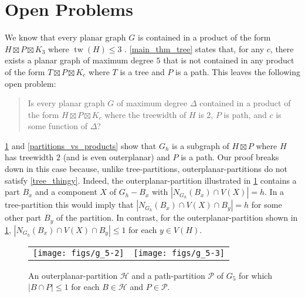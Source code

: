 \documentclass{patmorin}
\DeclareMathOperator{\tw}{tw}
\renewcommand{\le}{\leqslant}
\begin{document}
\section{Open Problems}

We know that every planar graph $G$ is contained in a product of the form $H\boxtimes P\boxtimes K_3$ where $\tw(H)\le 3$ \cite{dujmovic.joret.ea:planar}. \cref{main_thm_tree} states that, for any $c$, there exists a planar graph of maximum degree $5$ that is not contained in any product of the form $T\boxtimes P\boxtimes K_c$ where $T$ is a tree and $P$ is a path.  This leaves the following open problem:

\begin{quote}

  Is every planar graph $G$ of maximum degree $\Delta$ contained in a product of the form $H\boxtimes P\boxtimes K_c$ where the treewidth of $H$ is $2$, $P$ is path, and $c$ is some function of $\Delta$?
\end{quote}

\cref{two_tree} and \cref{partitions_vs_products} show that $G_h$ is a subgraph of $H\boxtimes P$ where $H$ has treewidth $2$ (and is even outerplanar) and $P$ is a path. Our proof breaks down in this case because, unlike tree-partitions, outerplanar-partitions do not satisfy \cref{tree_thingy}.  Indeed, the outerplanar-partition illustrated in \cref{two_tree} contains a part $B_x$ and a component $X$ of $G_h-B_x$ with $|N_{G_h}(B_x)\cap V(X)|=h$.  In a tree-partition this would imply that $|N_{G_h}(B_x)\cap V(X)\cap B_y|=h$ for some other part $B_y$ of the partition.  In contrast, for the outerplanar-partition shown in \cref{two_tree}, $|N_{G_h}(B_x)\cap V(X)\cap B_y|\le 1$ for each $y\in V(H)$.


\begin{figure}
  \begin{center}
    \begin{tabular}{cc}
      \texttt{[image: figs/g\_5-2]} & \texttt{[image: figs/g\_5-3]}
    \end{tabular}
  \end{center}
  \caption{An outerplanar-partition $\mathcal{H}$ and a path-partition $\mathcal{P}$ of $G_5$ for which $|B\cap P|\le 1$ for each $B\in\mathcal{H}$ and $P\in\mathcal{P}$.}
  \label{two_tree}
\end{figure}
\end{document}
